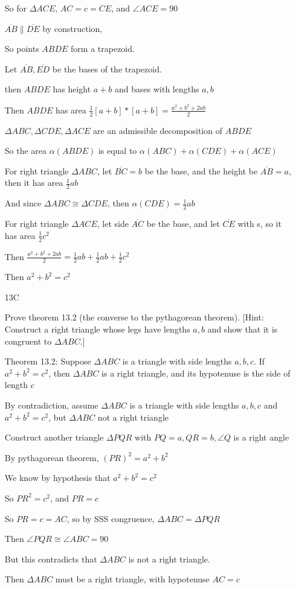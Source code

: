 \documentclass[11pt]{article}
\newcommand{\segment}[1]{\overline{#1}}
\begin{document}
\begin{itemize}
		So for $\Delta ACE$, $AC = c = CE$, and $\angle ACE = 90$

		$\segment{AB} \parallel \segment{DE}$ by construction, 

		So points $ABDE$ form a trapezoid.

		Let $\segment{AB}, \segment{ED}$ be the bases of the trapezoid.

		then $ABDE$ has height $a + b$ and bases with lengths $a, b$

		Then $ABDE$ has area $\frac{1}{2}[a + b] * [a+b] = \frac{a^2 + b^2 + 2ab}{2}$

		$\Delta ABC, \Delta CDE, \Delta ACE$ are an admissible decomposition of $ABDE$

		So the area $\alpha(ABDE)$ is equal to $\alpha(ABC) + \alpha(CDE) + \alpha(ACE)$

		For right triangle $\Delta ABC$, let $\segment{BC} = b$ be the base, and the height be $\segment{AB} = a$, then it has area $\frac{1}{2}ab$

		And since $\Delta ABC \cong \Delta CDE$, then $\alpha(CDE) = \frac{1}{2}ab$

		For right triangle $\Delta ACE$, let side $\segment{AC}$ be the base, and let $\segment{CE}$ with s, so it has area $\frac{1}{2}c^2$

		Then $\frac{a^2 + b^2 + 2ab}{2} = \frac{1}{2}ab + \frac{1}{2}ab + \frac{1}{2}c^2$

		Then $a^2 + b^2 = c^2$

	\item[13C]

		Prove theorem 13.2 (the converse to the pythagorean theorem). [Hint: Construct a right triangle whose legs have lengths $a,b$ and show that it is congruent to $\Delta ABC$.]

		Theorem 13.2: Suppose $\Delta ABC$ is a triangle with side lengths $a,b,c$. If $a^2 + b^2 = c^2$, then $\Delta ABC$ is a right triangle, and its hypotenuse is the side of length $c$

		By contradiction, assume $\Delta ABC$ is a triangle with side lengths $a,b,c$ and $a^2 + b^2 = c^2$, but $\Delta ABC$ not a right triangle

		Construct another triangle $\Delta PQR$ with $PQ = a, QR = b, \angle Q$ is a right angle

		By pythagorean theorem, $(PR)^2 = a^2 + b^2$

		We know by hypothesis that $a^2 + b^2 = c^2$

		So $PR^2 = c^2$, and $PR = c$

		So $PR = c = AC$, so by SSS congruence, $\Delta ABC = \Delta PQR$

		Then $\angle PQR \cong \angle ABC = 90$

		But this contradicts that $\Delta ABC$ is not a right triangle.

		Then $\Delta ABC$ must be a right triangle, with hypotenuse $AC = c$

\end{itemize}
\end{document}

